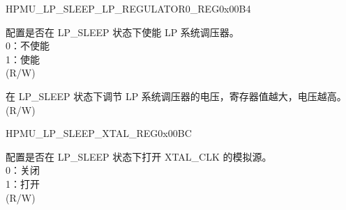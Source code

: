 \begin{register}{H}{PMU\_LP\_SLEEP\_LP\_REGULATOR0\_REG}{0x00B4}\label{regdesc:PMULPSLEEPLPREGULATOR0REG}
%
%
%
%
\regnewline%
\begin{regdesc}\begin{reglist}
\label{fielddesc:PMULPSLEEPLPREGULATORXPD}\item [PMU\_LP\_SLEEP\_LP\_REGULATOR\_XPD] 配置是否在 LP\_SLEEP 状态下使能 LP 系统调压器。 \\
0：不使能\\
1：使能 \\
(R/W)
\label{fielddesc:PMULPSLEEPLPREGULATORDBIAS}\item [PMU\_LP\_SLEEP\_LP\_REGULATOR\_DBIAS] 在 LP\_SLEEP 状态下调节 LP 系统调压器的电压，寄存器值越大，电压越高。(R/W)
\end{reglist}\end{regdesc}
\end{register}




\begin{register}{H}{PMU\_LP\_SLEEP\_XTAL\_REG}{0x00BC}\label{regdesc:PMULPSLEEPXTALREG}
%
%
\regnewline%
\begin{regdesc}\begin{reglist}
\label{fielddesc:PMULPSLEEPXPDXTAL}\item [PMU\_LP\_SLEEP\_XPD\_XTAL] 配置是否在 LP\_SLEEP 状态下打开 XTAL\_CLK 的模拟源。\\
0：关闭\\
1：打开\\
(R/W)
\end{reglist}\end{regdesc}
\end{register}


